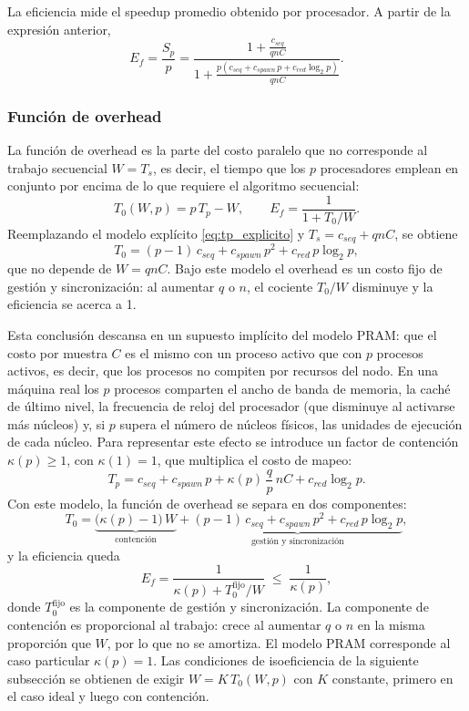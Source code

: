 \documentclass[11pt, a4paper]{article}
\begin{document}
La eficiencia mide el speedup promedio obtenido por procesador. A partir de la expresión anterior,
\begin{equation}
E_f=\frac{S_p}{p}
 =\frac{1+\frac{c_{seq}}{qnC}}
 {1+\frac{p\left(c_{seq}+c_{spawn}\,p+c_{red}\log_2 p\right)}{qnC}}.
\label{eq:eficiencia}
\end{equation}

\subsubsection{Función de overhead}

La función de overhead es la parte del costo paralelo que no corresponde al trabajo secuencial $W=T_s$, es decir, el tiempo que los $p$ procesadores emplean en conjunto por encima de lo que requiere el algoritmo secuencial:
\begin{equation}
T_0(W,p)=p\,T_p-W,
\qquad
E_f=\frac{1}{1+T_0/W}.
\label{eq:overhead}
\end{equation}
Reemplazando el modelo explícito \eqref{eq:tp_explicito} y $T_s=c_{seq}+qnC$, se obtiene
\[
T_0=(p-1)\,c_{seq}+c_{spawn}\,p^2+c_{red}\,p\log_2 p,
\]
que no depende de $W=qnC$. Bajo este modelo el overhead es un costo fijo de gestión y sincronización: al aumentar $q$ o $n$, el cociente $T_0/W$ disminuye y la eficiencia se acerca a 1.

Esta conclusión descansa en un supuesto implícito del modelo PRAM: que el costo por muestra $C$ es el mismo con un proceso activo que con $p$ procesos activos, es decir, que los procesos no compiten por recursos del nodo. En una máquina real los $p$ procesos comparten el ancho de banda de memoria, la caché de último nivel, la frecuencia de reloj del procesador (que disminuye al activarse más núcleos) y, si $p$ supera el número de núcleos físicos, las unidades de ejecución de cada núcleo. Para representar este efecto se introduce un factor de contención $\kappa(p)\ge 1$, con $\kappa(1)=1$, que multiplica el costo de mapeo:
\begin{equation}
T_p=c_{seq}+c_{spawn}\,p+\kappa(p)\,\frac{q}{p}\,nC+c_{red}\log_2 p.
\label{eq:tp_kappa}
\end{equation}
Con este modelo, la función de overhead se separa en dos componentes:
\begin{equation}
T_0=\underbrace{\bigl(\kappa(p)-1\bigr)\,W}_{\text{contención}}
+\underbrace{(p-1)\,c_{seq}+c_{spawn}\,p^2+c_{red}\,p\log_2 p}_{\text{gestión y sincronización}},
\label{eq:overhead_kappa}
\end{equation}
y la eficiencia queda
\[
E_f=\frac{1}{\kappa(p)+T_0^{\mathrm{fijo}}/W}\;\le\;\frac{1}{\kappa(p)},
\]
donde $T_0^{\mathrm{fijo}}$ es la componente de gestión y sincronización. La componente de contención es proporcional al trabajo: crece al aumentar $q$ o $n$ en la misma proporción que $W$, por lo que no se amortiza. El modelo PRAM corresponde al caso particular $\kappa(p)=1$. Las condiciones de isoeficiencia de la siguiente subsección se obtienen de exigir $W=K\,T_0(W,p)$ con $K$ constante, primero en el caso ideal y luego con contención.
\end{document}
